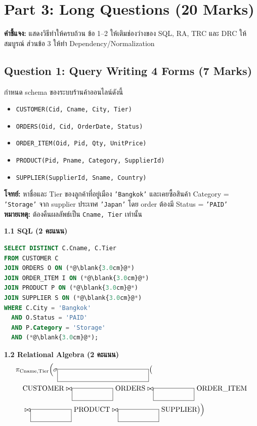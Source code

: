 \documentclass[a4paper,12pt]{article}
\newcommand{\blank}[1]{\fbox{\rule{0pt}{1.1em}\hspace{#1}}}
\begin{document}
\newpage
\section*{Part 3: Long Questions (20 Marks)}
\textbf{คำชี้แจง:} แสดงวิธีทำให้ครบถ้วน ข้อ 1--2 ให้เติมช่องว่างของ SQL, RA, TRC และ DRC ให้สมบูรณ์ ส่วนข้อ 3 ให้ทำ Dependency/Normalization

\subsection*{Question 1: Query Writing 4 Forms (7 Marks)}
กำหนด schema ของระบบร้านค้าออนไลน์ดังนี้
\begin{itemize}
    \item \texttt{CUSTOMER(Cid, Cname, City, Tier)}
    \item \texttt{ORDERS(Oid, Cid, OrderDate, Status)}
    \item \texttt{ORDER\_ITEM(Oid, Pid, Qty, UnitPrice)}
    \item \texttt{PRODUCT(Pid, Pname, Category, SupplierId)}
    \item \texttt{SUPPLIER(SupplierId, Sname, Country)}
\end{itemize}

\noindent\textbf{โจทย์:} หาชื่อและ Tier ของลูกค้าที่อยู่เมือง \texttt{'Bangkok'} และเคยซื้อสินค้า Category = \texttt{'Storage'} จาก supplier ประเทศ \texttt{'Japan'} โดย order ต้องมี Status = \texttt{'PAID'}\\
\textbf{หมายเหตุ:} ต้องคืนผลลัพธ์เป็น \texttt{Cname, Tier} เท่านั้น

\vspace{0.2cm}
\textbf{1.1 SQL (2 คะแนน)}
\begin{lstlisting}[language=SQL]
SELECT DISTINCT C.Cname, C.Tier
FROM CUSTOMER C
JOIN ORDERS O ON (*@\blank{3.0cm}@*)
JOIN ORDER_ITEM I ON (*@\blank{3.0cm}@*)
JOIN PRODUCT P ON (*@\blank{3.0cm}@*)
JOIN SUPPLIER S ON (*@\blank{3.0cm}@*)
WHERE C.City = 'Bangkok'
  AND O.Status = 'PAID'
  AND P.Category = 'Storage'
  AND (*@\blank{3.0cm}@*);
\end{lstlisting}

\vspace{0.1cm}
\textbf{1.2 Relational Algebra (2 คะแนน)}
\[
\begin{aligned}
&\pi_{\text{Cname},\text{Tier}}\Big(
  \sigma_{\blank{4.3cm}}\big(\\
&\quad \text{CUSTOMER}
  \bowtie_{\blank{1.8cm}}
  \text{ORDERS}
  \bowtie_{\blank{1.8cm}}
  \text{ORDER\_ITEM}\\
&\quad \bowtie_{\blank{1.8cm}}
  \text{PRODUCT}
  \bowtie_{\blank{1.8cm}}
  \text{SUPPLIER}
  \big)\Big)
\end{aligned}
\]
\end{document}
